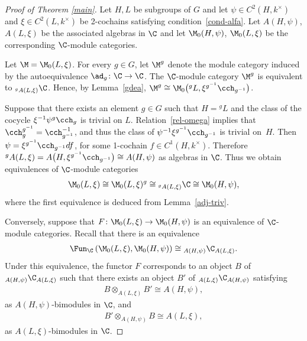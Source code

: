 \begin{proof}[Proof of Theorem \ref{main}] Let $H, L$ be subgroups of $G$ and let $\psi \in C^2(H, k^{\times})$ and $\xi \in C^2(L, k^{\times})$ be 2-cochains satisfying condition~\eqref{cond-alfa}. Let $A(H, \psi)$, $A(L, \xi)$ be the associated algebras in $\C$ and let $\M_0(H, \psi)$, $\M_0(L, \xi)$ be the corresponding $\C$-module categories.

Let $\M = \M_0(L, \xi)$. For every $g \in G$, let $\M^g$ denote the module category induced by the autoequivalence $\ad_g\colon \C \to \C$.
The $\C$-module category $\M^g$ is equivalent to $_{^gA(L, \xi)}\C$. Hence, by Lemma~\ref{gdea}, $\M^g \cong \M_0\big({}^gL, \xi^{g^{-1}} \cch_{g^{-1}}\big)$.

Suppose that there exists an element $g \in G$ such that $H = {}^gL$ and the class of the cocycle $\xi^{-1}\psi^g\cch_g$ is trivial on $L$. Relation~\eqref{rel-omega} implies that $\cch_g^{g^{-1}} = \cch_{g^{-1}}^{-1}$, and thus the class of $\psi^{-1}\xi^{g^{-1}}\cch_{g^{-1}}$ is trivial on~$H$. Then $\psi = \xi^{g^{-1}}\cch_{g^{-1}} df$, for some 1-cochain $f \in C^1(H, k^{\times})$. Therefore $^gA(L, \xi) = A\big(H, \xi^{g^{-1}} \cch_{g^{-1}}\big) \cong A(H, \psi)$ as algebras in $\C$. Thus we obtain equivalences of $\C$-module categories
\begin{gather*}\M_0(L, \xi) \cong \M_0(L, \xi)^g \cong {} _{^gA(L, \xi)}\C \cong \M_0(H, \psi),\end{gather*}
where the f\/irst equivalence is deduced from Lemma~\ref{adj-triv}.

Conversely, suppose that $F\colon \M_0(L, \xi) \to \M_0(H, \psi)$ is an equivalence of $\C$-module categories. Recall that there is an equivalence
\begin{gather*}\label{equiv-fun-1} \Fun_\C\left(\M_0(L, \xi), \M_0(H, \psi)\right) \cong {} _{A(H, \psi)}\C_{A(L, \xi)}.\end{gather*}
Under this equivalence, the functor $F$ corresponds to an object $B$ of $_{A(H, \psi)}\C_{A(L, \xi)}$ such that there exists an object $B'$ of $_{A(L, \xi)}\C_{A(H, \psi)}$ satisfying
\begin{gather}\label{dim-b}B \otimes_{A(L, \xi)}B' \cong A(H, \psi),\end{gather} as $A(H, \psi)$-bimodules in $\C$, and
\begin{gather}\label{bbprime}B' \otimes_{A(H, \psi)}B \cong A(L, \xi), \end{gather} as $A(L, \xi)$-bimodules in $\C$.


\end{proof}
